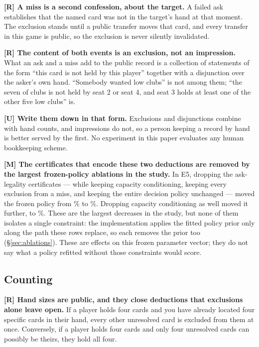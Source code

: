 \textbf{[R] A miss is a second confession, about the target.} A failed ask
establishes that the named card was not in the target's hand at that moment. The
exclusion stands until a public transfer moves that card, and every transfer in
this game is public, so the exclusion is never silently invalidated.

\textbf{[R] The content of both events is an exclusion, not an impression.}
What an ask and a miss add to the public record is a collection of statements of the
form ``this card is not held by this player'' together with a disjunction over
the asker's own hand. ``Somebody wanted low clubs'' is not among them; ``the
seven of clubs is not held by seat 2 or seat 4, and seat 3 holds at least one of
the other five low clubs'' is.

\textbf{[U] Write them down in that form.} Exclusions and disjunctions combine
with hand counts, and impressions do not, so a person keeping a record by hand
is better served by the first. No experiment in this paper evaluates any human
bookkeeping scheme.

\textbf{[M] The certificates that encode these two deductions are removed by the
largest frozen-policy ablations in the study.} In E5, dropping the ask-legality
certificates --- while keeping capacity conditioning, keeping every exclusion
from a miss, and keeping the entire decision policy unchanged --- moved the
frozen policy from \numAblRef\% to \numAblSinkhornAbs\%. Dropping capacity
conditioning as well moved it further, to \numAblCFourAbs\%. These are the
largest decreases in the study, but none of them isolates a single constraint:
the implementation applies the fitted policy prior only along the path these
rows replace, so each removes the prior too (\S\ref{sec:ablations}).
These are effects on this
frozen parameter vector; they do not say what a policy refitted without those
constraints would score.

\subsection{Counting}
\label{app:human-count}

\textbf{[R] Hand sizes are public, and they close deductions that exclusions
alone leave open.} If a player holds four cards and you have already located four
specific cards in their hand, every other unresolved card is excluded from them
at once. Conversely, if a player holds four cards and only four unresolved cards
can possibly be theirs, they hold all four.

